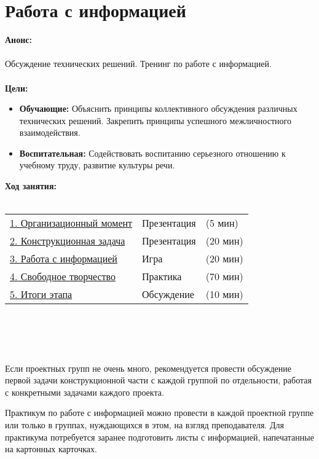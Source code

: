 \chapter{\label{lesson25}Работа с информацией}
{\bfseries Анонс:}\\\\
Обсуждение технических решений. Тренинг по работе с информацией.\\\\
{\bfseries Цели:}
\begin{itemize}
	\item{}{\bfseries Обучающие:} Объяснить принципы коллективного обсуждения различных технических решений. Закрепить принципы успешного межличностного взаимодействия. 
	\item{}{\bfseries Воспитательная:} Содействовать воспитанию серьезного отношению к учебному труду, развитие культуры речи. \\
\end{itemize}	
{\bfseries Ход занятия:}\\\\
\begin{tabular}[h!]{lll}
	{\hyperlink{lesson25x1}{1. Организационный момент}}&{Презентация}&{(5 мин)}\\
	{\hyperlink{lesson25x2}{2. Конструкционная задача}}&{Презентация}&{(20 мин)}\\
	{\hyperlink{lesson25x3}{3. Работа с информацией}}&{Игра}&{(20 мин)}\\
	{\hyperlink{lesson25x4}{4. Свободное творчество}}&{Практика}&{(70 мин)}\\
	{\hyperlink{lesson25x5}{5. Итоги этапа}}&{Обсуждение}&{(10 мин)}\\
\end{tabular}\\\\

{\hypertarget{lesson25x1}{}}\\\\

Если проектных групп не очень много, рекомендуется провести обсуждение первой задачи конструкционной части с каждой группой по отдельности, работая с конкретными задачами каждого проекта.

Практикум по работе с информацией можно провести в каждой проектной группе или только в группах, нуждающихся в этом, на взгляд преподавателя. Для практикума потребуется заранее подготовить листы с информацией, напечатанные на картонных карточках.\\\\

